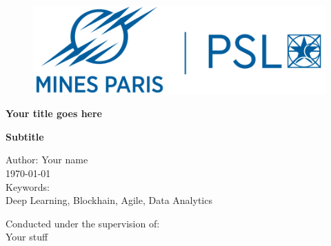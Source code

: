 \begin{titlepage}
    \begin{center}
    
        \begin{figure}[!htb]
          \centering
           \begin{minipage}{0.32\textwidth}
             \centering
             \includegraphics[width=\linewidth]{../figs/logo/mines.png}
           \end{minipage}\hfill
        \end{figure}

        \vspace*{2.8cm}
        \centering
        \LARGE  
        \textbf{Your title goes here}
        
        \vspace*{0.25cm}
        \large 
        \textbf{Subtitle}
        
        \vspace{3cm}
        \large
        Author: Your name\\
         
         \vspace{2cm}
         \large 
         \today \\
        
        \vspace{2cm}
        \large 
        Keywords:\\
        Deep Learning, Blockhain, Agile, Data Analytics
        
        \vspace{5.5cm}
        \normalsize
        Conducted under the supervision of: \\
            Your stuff
        
        
    \end{center}
\end{titlepage}

\thispagestyle{empty}
\cleardoublepage

